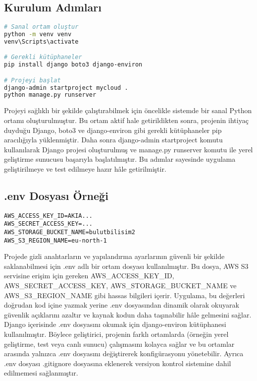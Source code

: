 \section{}

\subsection{Kurulum Adımları}
\begin{lstlisting}[language=bash, caption=Kurulum ve Başlatma]
# Sanal ortam oluştur
python -m venv venv
venv\Scripts\activate

# Gerekli kütüphaneler
pip install django boto3 django-environ

# Projeyi başlat
django-admin startproject mycloud .
python manage.py runserver
\end{lstlisting}
Projeyi sağlıklı bir şekilde çalıştırabilmek için öncelikle sistemde bir sanal Python ortamı oluşturulmuştur. Bu ortam aktif hale getirildikten sonra, projenin ihtiyaç duyduğu Django, boto3 ve django-environ gibi gerekli kütüphaneler pip aracılığıyla yüklenmiştir. Daha sonra django-admin startproject komutu kullanılarak Django projesi oluşturulmuş ve manage.py runserver komutu ile yerel geliştirme sunucusu başarıyla başlatılmıştır. Bu adımlar sayesinde uygulama geliştirilmeye ve test edilmeye hazır hâle getirilmiştir.

\subsection{.env Dosyası Örneği}
\begin{lstlisting}[caption=.env içeriği]
AWS_ACCESS_KEY_ID=AKIA...
AWS_SECRET_ACCESS_KEY=...
AWS_STORAGE_BUCKET_NAME=bulutbilisim2
AWS_S3_REGION_NAME=eu-north-1
\end{lstlisting}

Projede gizli anahtarların ve yapılandırma ayarlarının güvenli bir şekilde saklanabilmesi için .env adlı bir ortam dosyası kullanılmıştır. Bu dosya, AWS S3 servisine erişim için gereken AWS_ACCESS_KEY_ID, AWS_SECRET_ACCESS_KEY, AWS_STORAGE_BUCKET_NAME ve AWS_S3_REGION_NAME gibi hassas bilgileri içerir. Uygulama, bu değerleri doğrudan kod içine yazmak yerine .env dosyasından dinamik olarak okuyarak güvenlik açıklarını azaltır ve kaynak kodun daha taşınabilir hâle gelmesini sağlar. Django içerisinde .env dosyasını okumak için django-environ kütüphanesi kullanılmıştır. Böylece geliştirici, projenin farklı ortamlarda (örneğin yerel geliştirme, test veya canlı sunucu) çalışmasını kolayca sağlar ve bu ortamlar arasında yalnızca .env dosyasını değiştirerek konfigürasyonu yönetebilir. Ayrıca .env dosyası .gitignore dosyasına eklenerek versiyon kontrol sistemine dahil edilmemesi sağlanmıştır.

